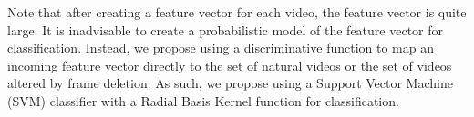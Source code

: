 Note that after creating a feature vector for each video, the feature vector is quite large. It is inadvisable to create a probabilistic model of the feature vector for classification. Instead, we propose using a discriminative function to map an incoming feature vector directly to the set of natural videos or the set of videos altered by frame deletion. As such, we propose using a Support Vector Machine (SVM) classifier with a Radial Basis Kernel function for classification.